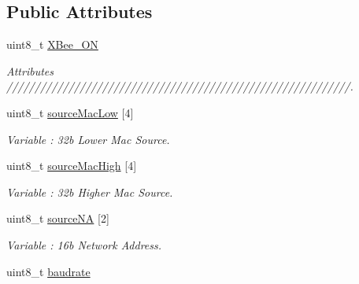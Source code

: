\subsection*{Public Attributes}
\begin{DoxyCompactItemize}
\item 
uint8\+\_\+t \hyperlink{class_wasp_x_bee_core_a36a70db11a542cd76745ab7dfbaafff1}{X\+Bee\+\_\+\+ON}
\begin{DoxyCompactList}\small\item\em Attributes /////////////////////////////////////////////////////////////. \end{DoxyCompactList}\item 
uint8\+\_\+t \hyperlink{class_wasp_x_bee_core_a4e09acc90e1143bde2abbfbc692f12ad}{source\+Mac\+Low} \mbox{[}4\mbox{]}\hypertarget{class_wasp_x_bee_core_a4e09acc90e1143bde2abbfbc692f12ad}{}\label{class_wasp_x_bee_core_a4e09acc90e1143bde2abbfbc692f12ad}

\begin{DoxyCompactList}\small\item\em Variable \+: 32b Lower Mac Source. \end{DoxyCompactList}\item 
uint8\+\_\+t \hyperlink{class_wasp_x_bee_core_a1d66b92a26cea300cab43611b937dc95}{source\+Mac\+High} \mbox{[}4\mbox{]}\hypertarget{class_wasp_x_bee_core_a1d66b92a26cea300cab43611b937dc95}{}\label{class_wasp_x_bee_core_a1d66b92a26cea300cab43611b937dc95}

\begin{DoxyCompactList}\small\item\em Variable \+: 32b Higher Mac Source. \end{DoxyCompactList}\item 
uint8\+\_\+t \hyperlink{class_wasp_x_bee_core_a5cfb9b283cf9d7ad1d3f6b43930eb87b}{source\+NA} \mbox{[}2\mbox{]}\hypertarget{class_wasp_x_bee_core_a5cfb9b283cf9d7ad1d3f6b43930eb87b}{}\label{class_wasp_x_bee_core_a5cfb9b283cf9d7ad1d3f6b43930eb87b}

\begin{DoxyCompactList}\small\item\em Variable \+: 16b Network Address. \end{DoxyCompactList}\item 
uint8\+\_\+t \hyperlink{class_wasp_x_bee_core_a941e47995af72ef389d6509de71c6d73}{baudrate}\hypertarget{class_wasp_x_bee_core_a941e47995af72ef389d6509de71c6d73}{}\label{class_wasp_x_bee_core_a941e47995af72ef389d6509de71c6d73}


\end{DoxyCompactItemize}
